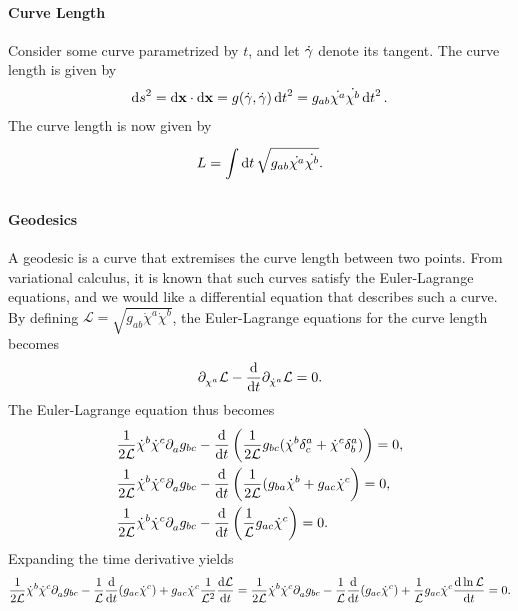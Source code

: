\paragraph{Curve Length}
Consider some curve parametrized by $t$, and let $\dot{\vb{\gamma}}$ denote its tangent. The curve length is given by
\begin{align*}
	\dd{s}^{2} = \dd{\vb{x}}\cdot\dd{\vb{x}} = g(\dot{\vb{\gamma}}, \dot{\vb{\gamma}})\dd{t}^{2} = g_{ab}\dot{\chi^{a}}\dot{\chi^{b}}\dd{t}^{2}.
\end{align*}
The curve length is now given by
\begin{align*}
	L = \int\limits_{}^{}\dd{t}{\sqrt{g_{ab}\dot{\chi^{a}}\dot{\chi^{b}}}}.
\end{align*}

\paragraph{Geodesics}
A geodesic is a curve that extremises the curve length between two points. From variational calculus, it is known that such curves satisfy the Euler-Lagrange equations, and we would like a differential equation that describes such a curve. By defining $\mathcal{L} = \sqrt{g_{ab}\dot{\chi}^{a}\dot{\chi}^{b}}$, the Euler-Lagrange equations for the curve length becomes
\begin{align*}
	\partial^{}_{\chi^{a}}{\mathcal{L}} - \dv{t}\partial^{}_{\dot{\chi}^{a}}{\mathcal{L}} = 0.
\end{align*}
The Euler-Lagrange equation thus becomes
\begin{align*}
	&\frac{1}{2\mathcal{L}}\dot{\chi}^{b}\dot{\chi}^{c}\del{}{a}{g_{bc}} - \dv{t}\left(\frac{1}{2\mathcal{L}}g_{bc}(\dot{\chi}^{b}\kdelta{a}{c} + \dot{\chi}^{c}\kdelta{a}{b})\right) = 0, \\
	&\frac{1}{2\mathcal{L}}\dot{\chi}^{b}\dot{\chi}^{c}\del{}{a}{g_{bc}} - \dv{t}\left(\frac{1}{2\mathcal{L}}(g_{ba}\dot{\chi}^{b} + g_{ac}\dot{\chi}^{c}\right) = 0, \\
	&\frac{1}{2\mathcal{L}}\dot{\chi}^{b}\dot{\chi}^{c}\del{}{a}{g_{bc}} - \dv{t}\left(\frac{1}{\mathcal{L}}g_{ac}\dot{\chi}^{c}\right) = 0.
\end{align*}
Expanding the time derivative yields
\begin{align*}
	\frac{1}{2\mathcal{L}}\dot{\chi}^{b}\dot{\chi}^{c}\partial^{}_{a}{g_{bc}} - \frac{1}{\mathcal{L}}\dv{t}(g_{ac}\dot{\chi}^{c}) + g_{ac}\dot{\chi}^{c}\frac{1}{\mathcal{L}^{2}}\dv{\ensuremath{\mathcal{L}}}{t} = \frac{1}{2\mathcal{L}}\dot{\chi}^{b}\dot{\chi}^{c}\partial^{}_{a}{g_{bc}} - \frac{1}{\mathcal{L}}\dv{t}(g_{ac}\dot{\chi}^{c}) + \frac{1}{\mathcal{L}}g_{ac}\dot{\chi}^{c}\dv{\ln{\ensuremath{\mathcal{L}}}}{t} = 0.
\end{align*}
